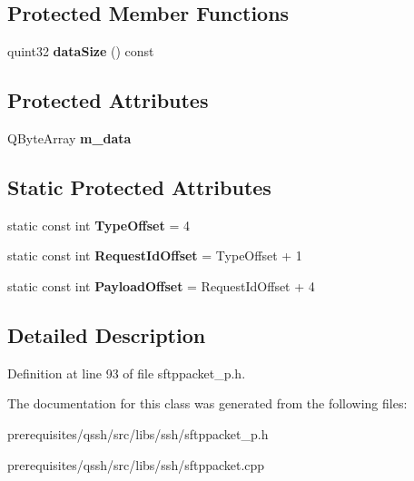 \subsection*{Protected Member Functions}
\begin{DoxyCompactItemize}
\item 
\mbox{\label{class_q_ssh_1_1_internal_1_1_abstract_sftp_packet_a1eeb8f24e476d0b3d2dc775ba1ec372e}} 
quint32 {\bfseries data\+Size} () const
\end{DoxyCompactItemize}
\subsection*{Protected Attributes}
\begin{DoxyCompactItemize}
\item 
\mbox{\label{class_q_ssh_1_1_internal_1_1_abstract_sftp_packet_a28295bf3d74a43330b5f155ee5c52f73}} 
Q\+Byte\+Array {\bfseries m\+\_\+data}
\end{DoxyCompactItemize}
\subsection*{Static Protected Attributes}
\begin{DoxyCompactItemize}
\item 
\mbox{\label{class_q_ssh_1_1_internal_1_1_abstract_sftp_packet_a392497e4fad1970c78256e4427ad3831}} 
static const int {\bfseries Type\+Offset} = 4
\item 
\mbox{\label{class_q_ssh_1_1_internal_1_1_abstract_sftp_packet_a21b3954bdd4c9da1c07fcb7873f5e80e}} 
static const int {\bfseries Request\+Id\+Offset} = Type\+Offset + 1
\item 
\mbox{\label{class_q_ssh_1_1_internal_1_1_abstract_sftp_packet_ad5769a7a36cf6f126efa38533c15dceb}} 
static const int {\bfseries Payload\+Offset} = Request\+Id\+Offset + 4
\end{DoxyCompactItemize}


\subsection{Detailed Description}


Definition at line 93 of file sftppacket\+\_\+p.\+h.



The documentation for this class was generated from the following files\+:\begin{DoxyCompactItemize}
\item 
prerequisites/qssh/src/libs/ssh/sftppacket\+\_\+p.\+h\item 
prerequisites/qssh/src/libs/ssh/sftppacket.\+cpp\end{DoxyCompactItemize}
